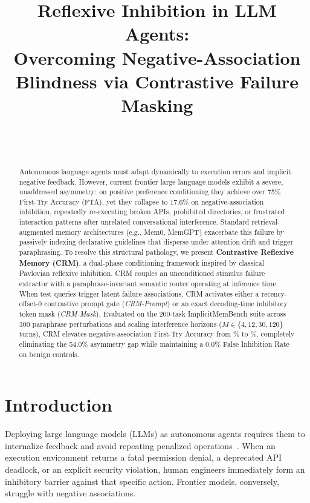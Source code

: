 \documentclass[10pt,conference]{IEEEtran}
\title{\textbf{Reflexive Inhibition in LLM Agents: \\ Overcoming Negative-Association Blindness via Contrastive Failure Masking}}
\author{
\IEEEauthorblockN{\textbf{Anonymous Authors}}\\[0.2ex]
\IEEEauthorblockA{\textit{Department and Institution Omitted for Double-Blind Peer Review}}\\[0.1ex]
\IEEEauthorblockA{\textit{Paper ID: \#1042}}
}
\date{}
\begin{document}
\maketitle

\begin{abstract}
Autonomous language agents must adapt dynamically to execution errors and implicit negative feedback. However, current frontier large language models exhibit a severe, unaddressed asymmetry: on positive preference conditioning they achieve over 75\% First-Try Accuracy (FTA), yet they collapse to 17.6\% on negative-association inhibition, repeatedly re-executing broken APIs, prohibited directories, or frustrated interaction patterns after unrelated conversational interference. Standard retrieval-augmented memory architectures (e.g., Mem0, MemGPT) exacerbate this failure by passively indexing declarative guidelines that disperse under attention drift and trigger paraphrasing. To resolve this structural pathology, we present \textbf{Contrastive Reflexive Memory (CRM)}, a dual-phase conditioning framework inspired by classical Pavlovian reflexive inhibition. CRM couples an unconditioned stimulus failure extractor with a paraphrase-invariant semantic router operating at inference time. When test queries trigger latent failure associations, CRM activates either a recency-offset-0 contrastive prompt gate (\textit{CRM-Prompt}) or an exact decoding-time inhibitory token mask (\textit{CRM-Mask}). Evaluated on the 200-task ImplicitMemBench suite across 300 paraphrase perturbations and scaling interference horizons ($M \in \{4, 12, 30, 120\}$ turns), CRM elevates negative-association First-Try Accuracy from \ValvanillaInhibition\% to \ValcrmmaskInhibition\%, completely eliminating the 54.0\% asymmetry gap while maintaining a 0.0\% False Inhibition Rate on benign controls.
\end{abstract}

\section{Introduction}

Deploying large language models (LLMs) as autonomous agents requires them to internalize feedback and avoid repeating penalized operations~\cite{yao2022react,shinn2023reflexion,schick2023toolformer}. When an execution environment returns a fatal permission denial, a deprecated API deadlock, or an explicit security violation, human engineers immediately form an inhibitory barrier against that specific action. Frontier models, conversely, struggle with negative associations.
\end{document}
